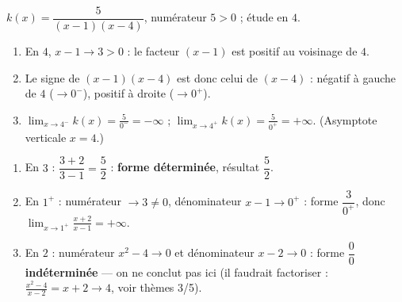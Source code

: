\documentclass[11pt,a4paper]{article}
\begin{document}
\begin{correction}
$k(x)=\dfrac{5}{(x-1)(x-4)}$, numérateur $5>0$ ; étude en $4$.
\begin{enumerate}[label=\alph*),leftmargin=2em,itemsep=3pt]
  \item En $4$, $x-1\to 3>0$ : le facteur $(x-1)$ est positif au voisinage de $4$.
  \item Le signe de $(x-1)(x-4)$ est donc celui de $(x-4)$ : négatif à gauche de $4$ ($\to 0^{-}$),
        positif à droite ($\to 0^{+}$).
  \item $\displaystyle\lim_{x\to 4^{-}} k(x)=\frac{5}{0^{-}}=-\infty$ ; \quad
        $\displaystyle\lim_{x\to 4^{+}} k(x)=\frac{5}{0^{+}}=+\infty$. (Asymptote verticale $x=4$.)
\end{enumerate}
\end{correction}

\begin{correction}
\begin{enumerate}[label=\alph*),leftmargin=2em,itemsep=3pt]
  \item En $3$ : $\dfrac{3+2}{3-1}=\dfrac{5}{2}$ : \textbf{forme déterminée}, résultat $\dfrac52$.
  \item En $1^{+}$ : numérateur $\to 3\neq 0$, dénominateur $x-1\to 0^{+}$ : forme $\dfrac{3}{0^{+}}$,
        donc $\displaystyle\lim_{x\to 1^{+}}\frac{x+2}{x-1}=+\infty$.
  \item En $2$ : numérateur $x^2-4\to 0$ et dénominateur $x-2\to 0$ : forme $\dfrac{0}{0}$
        \textbf{indéterminée} — on ne conclut pas ici (il faudrait factoriser : $\frac{x^2-4}{x-2}=x+2\to 4$,
        voir thèmes 3/5).
\end{enumerate}
\end{correction}
\end{document}
